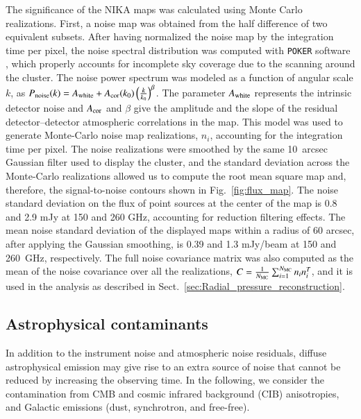 \documentclass[traditabstract]{aa}
\begin{document}
The significance of the NIKA maps was calculated using Monte Carlo realizations. First, a noise map was obtained from the half difference of two equivalent subsets. After having normalized the noise map by the integration time per pixel, the noise spectral distribution was computed with {\tt POKER} software \citep{ponthieu2011}, which properly accounts for incomplete sky coverage due to the scanning around the cluster. The noise power spectrum was modeled as a function of angular scale $k$, as $P_{\rm noise}(k) = A_{\rm white} + A_{\rm cor}(k_0) \left(\frac{k}{k_0}\right)^{\beta}$. The parameter $A_{\rm white}$ represents the intrinsic detector noise and $A_{\rm cor}$ and $\beta$ give the amplitude and the slope of the residual detector--detector atmospheric correlations in the map. This model was used to generate Monte-Carlo noise map realizations, $n_i$, accounting for the integration time per pixel. The noise realizations were smoothed by the same 10~arcsec Gaussian filter used to display the cluster, and the standard deviation across the Monte-Carlo realizations allowed us to compute the root mean square map and, therefore, the signal-to-noise contours shown in Fig.~\ref{fig:flux_map}. The noise standard deviation on the flux of point sources at the center of the map is 0.8 and 2.9 mJy at 150 and 260 GHz, accounting for reduction filtering effects. The mean noise standard deviation of the displayed maps within a radius of 60 arcsec, after applying the Gaussian smoothing, is 0.39 and 1.3 mJy/beam at 150 and 260~GHz, respectively. The full noise covariance matrix was also computed as the mean of the noise covariance over all the realizations, $C = \frac{1}{N_{\rm MC}}\sum_{i=1}^{N_{\rm MC}}n_i n_i^{T}$, and it is used in the analysis as described in Sect.~\ref{sec:Radial_pressure_reconstruction}.

\subsection{Astrophysical contaminants}\label{sec:astrophysical_contaminant}
In addition to the instrument noise and atmospheric noise residuals, diffuse astrophysical emission may give rise to an extra source of noise that cannot be reduced by increasing the observing time. In the following, we consider the contamination from CMB and cosmic infrared background (CIB) anisotropies, and Galactic emissions (dust, synchrotron, and free-free). 
\end{document}
